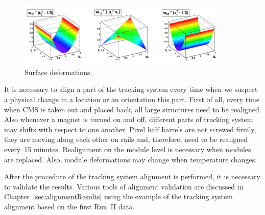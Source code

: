 \begin{figure}[htb]
    \begin{center}
        \includegraphics[width=0.90\textwidth]{../figs/Alignment/alignment_surface_deformations.png}
    \end{center}
    \caption{Surface deformations.}
    \label{fig:surfaceDeformations}
\end{figure}

It is necessary to align a part of the tracking system every time when we suspect a physical change in a location or an orientation this part. First of all, every time when CMS is taken out and placed back, all large structures need to be realigned. Also whenever a magnet is turned on and off, different parts of tracking system may shifts with respect to one another. Pixel half barrels are not screwed firmly, they are moving along each other on rails and, therefore, need to be realigned every~15 minutes. Realignment on the module level is necessary when modules are replaced. Also, module deformations may change when temperature changes. 

After the procedure of the tracking system alignment is performed, it is necessary to validate the results. Various tools of alignment validation are discussed in Chapter~\ref{sec:alignmentResults} using the example of the tracking system alignment based on the first Run~II data.   


